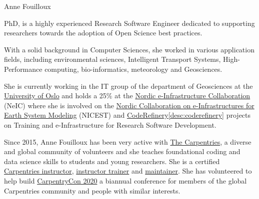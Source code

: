 \begin{participant}[type=leadPI,PM=24,gender=female]{Anne Fouilloux}






  \medskip PhD, is a highly experienced Research Software Engineer dedicated to supporting
  researchers towards the adoption of Open Science best practices.

  With a solid background in Computer Sciences, she worked in various application fields, including environmental sciences, Intelligent Transport Systems, High-Performance computing, bio-informatics, meteorology and Geosciences.

  She is currently working in the IT group of the department of Geosciences at the \href{https://www.mn.uio.no/geo/english}{University of Oslo} and holds a 25\% at the \href{https://neic.no}{Nordic e-Infrastructure Collaboration} (NeIC) where she is involved on the \href{https://neic.no/nicest/}{Nordic Collaboration on e-Infrastructures for Earth System Modeling} (NICEST) and \href{https://coderefinery.org}{CodeRefinery}\ref{desc:coderefinery} projects on Training and e-Infrastructure for Research Software Development. 

   Since 2015, Anne Fouilloux has been very active with \href{https://carpentries.org}{The Carpentries}, a diverse and global community of volunteers and she teaches foundational coding and data science skills to students and young researchers. She is a certified \href{https://carpentries.org/instructors/}{Carpentries instructor}, \href{https://carpentries.org/trainers/}{instructor trainer} and \href{https://carpentries.org/maintainers/}{maintainer}. She has volunteered to help build \href{http://www.carpentrycon.org/}{CarpentryCon 2020} a biannual conference for members of the global Carpentries community and people with similar interests. 


\end{participant}
